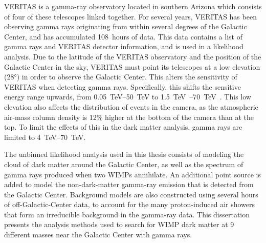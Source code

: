 VERITAS is a gamma-ray observatory located in southern Arizona which consists of four of these telescopes linked together.
For several years, VERITAS has been observing gamma rays originating from within several degrees of the Galactic Center, and has accumulated \SI{108}{hours} of data.
This data contains a list of gamma rays and VERITAS detector information, and is used in a likelihood analysis.
Due to the latitude of the VERITAS observatory and the position of the Galactic Center in the sky, VERITAS must point its telescopes at a low elevation (\nicetilde\ang{28}) in order to observe the Galactic Center.
This alters the sensitivity of VERITAS when detecting gamma rays.
Specifically, this shifts the sensitive energy range upwards, from \SIrange{0.05}{50}{\TeV} to \SIrange{1.5}{70}{\TeV{}}.
This low elevation also affects the distribution of events in the camera, as the atmospheric air-mass column density is 12\% higher at the bottom of the camera than at the top.
To limit the effects of this in the dark matter analysis, gamma rays are limited to \SIrange{4}{70}{\TeV}.

The unbinned likelihood analysis used in this thesis consists of modeling the cloud of dark matter around the Galactic Center, as well as the spectrum of gamma rays produced when two WIMPs annihilate.
An additional point source is added to model the non-dark-matter gamma-ray emission that is detected from the Galactic Center.
Background models are also constructed using several hours of off-Galactic-Center data, to account for the many proton-induced air showers that form an irreducible background in the gamma-ray data.
This dissertation presents the analysis methods used to search for WIMP dark matter at 9 different masses near the Galactic Center with \TeV{} gamma rays.


\cleartoevenpage[\thispagestyle{plain}]
\null
